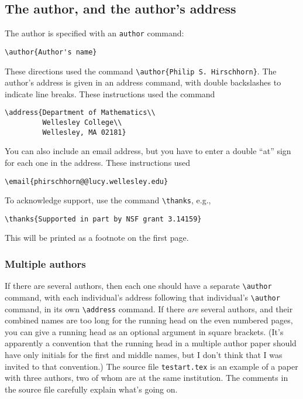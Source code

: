\subsection{The author, and the author's address}


The author is specified with an \verb"author" command:
\begin{center}
\verb"\author{Author's name}"
\end{center}
These directions used the command
\verb"\author{Philip S. Hirschhorn}".
The author's address is given in an address command, with double
backslashes to indicate line breaks.  These instructions used the
command
\begin{verbatim}
\address{Department of Mathematics\\
         Wellesley College\\
         Wellesley, MA 02181}
\end{verbatim}
You can also include an email address, but you have to enter a double
``at'' sign for each one in the address.  These instructions used
\begin{verbatim}
\email{phirschhorn@@lucy.wellesley.edu}
\end{verbatim}
To acknowledge support, use the command \verb"\thanks", e.g.,
%
\begin{verbatim}
\thanks{Supported in part by NSF grant 3.14159}
\end{verbatim}
%
This will be printed as a footnote on the first page.





\subsubsection*{Multiple authors}

If there are several authors, then each one should have a separate
\verb"\author" command, with each individual's address following that
individual's \verb"\author" command, in its own \verb"\address"
command.  If there {\em are\/} several authors, and their combined
names are too long for the running head on the even numbered pages,
you can give a running head as an optional argument in square
brackets.  (It's apparently a convention that the running head in a
multiple author paper should have only initials for the first and
middle names, but I don't think that I was invited to that
convention.)  The source file \verb"testart.tex" is an example
of a paper with three authors, two of whom are at the same
institution.  The comments in the source file carefully explain
what's going on.


